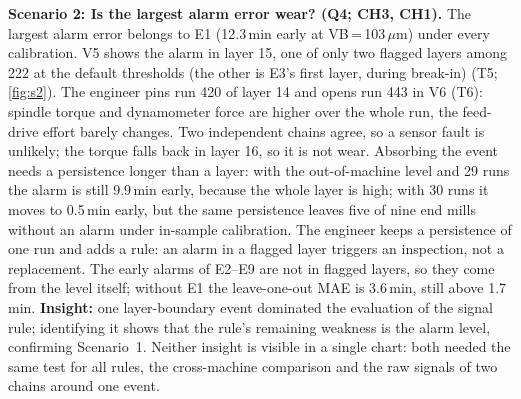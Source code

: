 \documentclass{vgtc}                          %
\begin{document}
\textbf{Scenario 2: Is the largest alarm error wear? (Q4; CH3, CH1).} The largest alarm error belongs to E1 (12.3\,min early
at VB\,=\,103\,$\mu$m) under every calibration. V5 shows the alarm in layer 15, one of only two flagged layers among 222 at
the default thresholds (the other is E3's first layer, during break-in) (T5; \cref{fig:s2}). The engineer pins run 420 of
layer 14 and opens run 443 in V6 (T6): spindle torque and dynamometer force are higher over the whole run, the feed-drive
effort barely changes. Two independent chains agree, so a sensor fault is unlikely; the torque falls back in layer 16, so it
is not wear. Absorbing the event needs a persistence longer than a layer: with the out-of-machine level and 29 runs the alarm
is still 9.9\,min early, because the whole layer is high; with 30 runs it moves to 0.5\,min early, but the same persistence
leaves five of nine end mills without an alarm under in-sample calibration. The engineer keeps a persistence of one run and
adds a rule: an alarm in a flagged layer triggers an inspection, not a replacement. The early alarms of E2--E9 are not in
flagged layers, so they come from the level itself; without E1 the leave-one-out MAE is 3.6\,min, still above 1.7\,min.
\textbf{Insight:} one layer-boundary event dominated the evaluation of the signal rule; identifying it shows that the rule's
remaining weakness is the alarm level, confirming Scenario~1. Neither insight is visible in a single chart: both needed the
same test for all rules, the cross-machine comparison and the raw signals of two chains around one event.

\end{document}
